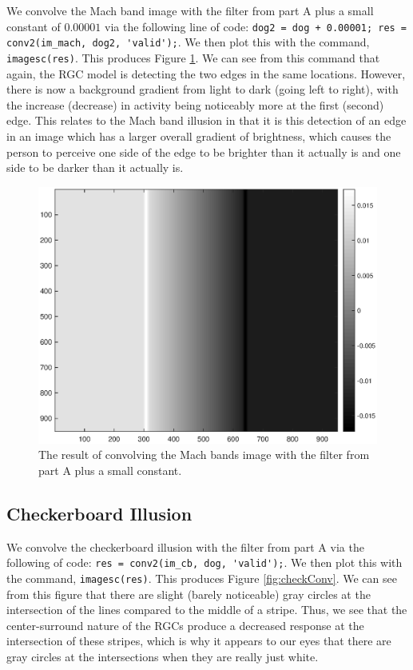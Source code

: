 \documentclass[11pt, oneside]{article}
\begin{document}
We convolve the Mach band image with the filter from part A plus a small constant of $0.00001$ via the following line of code: \lstinline{dog2 = dog + 0.00001; res = conv2(im_mach, dog2, 'valid');}. We then plot this with the command, \lstinline{imagesc(res)}. This produces Figure \ref{fig:machConv2}. We can see from this command that again, the RGC model is detecting the two edges in the same locations. However, there is now a background gradient from light to dark (going left to right), with the increase (decrease) in activity being noticeably more at the first (second) edge. This relates to the Mach band illusion in that it is this detection of an edge in an image which has a larger overall gradient of brightness, which causes the person to perceive one side of the edge to be brighter than it actually is and one side to be darker than it actually is. 

\begin{figure}[ht!]
\includegraphics[width=1\textwidth]{mach_dog_conv2.eps}
\caption{The result of convolving the Mach bands image with the filter from part A plus a small constant.}
\label{fig:machConv2}
\end{figure}

\subsection{Checkerboard Illusion}

We convolve the checkerboard illusion with the filter from part A via the following of code: \lstinline{res = conv2(im_cb, dog, 'valid');}. We then plot this with the command, \lstinline{imagesc(res)}. This produces Figure \ref{fig:checkConv}. We can see from this figure that there are slight (barely noticeable) gray circles at the intersection of the lines compared to the middle of a stripe. Thus, we see that the center-surround nature of the RGCs produce a decreased response at the intersection of these stripes, which is why it appears to our eyes that there are gray circles at the intersections when they are really just white.
\end{document}
